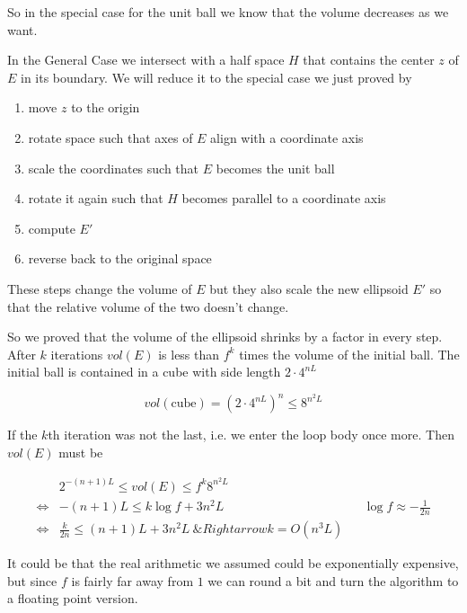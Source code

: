 So in the special case for the unit ball we know that the volume decreases as we want.

In the General Case we intersect with a half space $H$ that contains the center $z$ of $E$ in its boundary. We will reduce it to the special case we just proved by

\begin{enumerate}
\item move $z$ to the origin
\item rotate space such that axes of $E$ align with a coordinate axis
\item scale the coordinates such that $E$ becomes the unit ball
\item rotate it again such that $H$ becomes parallel to a coordinate axis
\item compute $E'$
\item reverse back to the original space
\end{enumerate}

These steps change the volume of $E$ but they also scale the new ellipsoid $E'$ so that the relative volume of the two doesn't change.

So we proved that the volume of the ellipsoid shrinks by a factor in every step. After $k$ iterations $vol(E)$ is less than $f^k$ times the volume of the initial ball. The initial ball is contained in a cube with side length $2\cdot 4^{nL}$

\[vol(\text{cube}) = (2 \cdot 4^{nL})^n \leq 8^{n^2L}\]

If the $k$th iteration was not the last, i.e. we enter the loop body once more. Then $vol(E)$ must be

\begin{align*}
&2^{-(n+1)L} \leq vol(E) \leq f^k 8^{n^2L} \\
\Leftrightarrow & -(n+1)L  \leq k\log f + 3n^2 L && \log f \approx -\frac{1}{2n}\\
\Leftrightarrow & \frac{k}{2n} \leq (n+1)L+3n^2L \
\&Rightarrow k = O(n^3L)
\end{align*}

It could be that the real arithmetic we assumed could be exponentially expensive, but since $f$ is fairly far away from $1$ we can round a bit and turn the algorithm to a floating point version.

